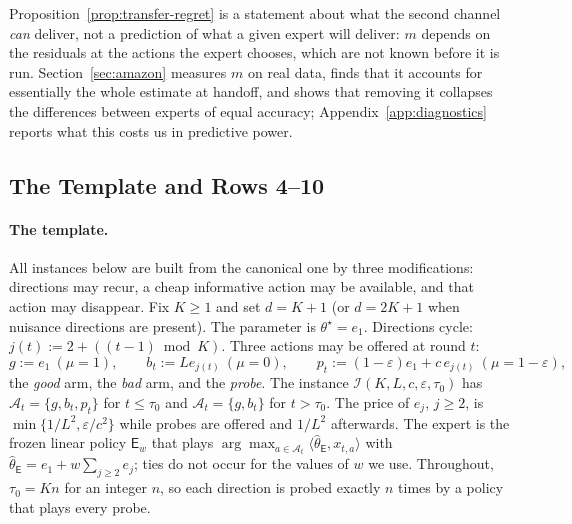 \documentclass{article}
\theoremstyle{definition}
\theoremstyle{remark}
\newcommand{\eps}{\varepsilon}
\theoremstyle{remark}
\newcommand{\Exp}{\mathsf{E}}
\begin{document}
Proposition~\ref{prop:transfer-regret} is a statement about what the second
channel \emph{can} deliver, not a prediction of what a given expert will
deliver: $m$ depends on the residuals at the actions the expert chooses, which
are not known before it is run. Section~\ref{sec:amazon} measures $m$ on real
data, finds that it accounts for essentially the whole estimate at handoff,
and shows that removing it collapses the differences between experts of equal
accuracy; Appendix~\ref{app:diagnostics} reports what this costs us in
predictive power.

\subsection{The Template and Rows 4--10}
\label{sec:template}


\paragraph{The template.}
All instances below are built from the canonical one by three modifications:
directions may recur, a cheap informative action may be available, and that
action may disappear. Fix $K\ge1$ and set $d=K+1$ (or $d=2K+1$ when nuisance
directions are present). The parameter is $\theta^\star=e_1$. Directions
cycle: $j(t):=2+((t-1)\bmod K)$. Three actions may be offered at round $t$:
\[
g:=e_1\ (\mu=1),\qquad
b_t:=Le_{j(t)}\ (\mu=0),\qquad
p_t:=(1-\eps)e_1+c\,e_{j(t)}\ (\mu=1-\eps),
\]
the \emph{good} arm, the \emph{bad} arm, and the \emph{probe}. The instance
$\mathcal I(K,L,c,\eps,\tau_0)$ has $\mathcal A_t=\{g,b_t,p_t\}$ for $t\le\tau_0$
and $\mathcal A_t=\{g,b_t\}$ for $t>\tau_0$. The price of $e_j$, $j\ge2$, is
$\min\{1/L^2,\eps/c^2\}$ while probes are offered and $1/L^2$ afterwards. The
expert is the frozen linear policy $\Exp_w$ that plays
$\arg\max_{a\in\mathcal A_t}\langle\widehat\theta_{\Exp},x_{t,a}\rangle$ with
$\widehat\theta_{\Exp}=e_1+w\sum_{j\ge2}e_j$; ties do not occur for the values
of $w$ we use. Throughout, $\tau_0=Kn$ for an integer $n$, so each direction is
probed exactly $n$ times by a policy that plays every probe.
\end{document}
